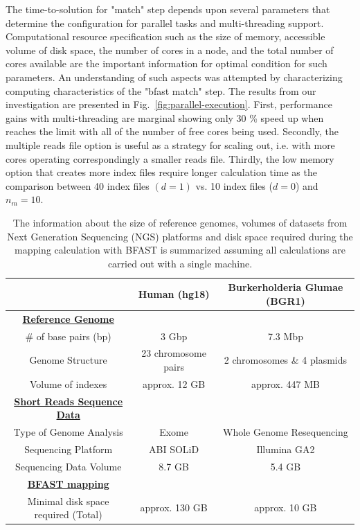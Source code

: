 \documentclass[12pt]{article}
\begin{document}
The time-to-solution for "match" step depends upon several parameters that determine the configuration for parallel tasks and multi-threading support.  Computational resource specification such as the size of memory, accessible volume of disk space, the number of cores in a node, and the total number of cores available are the important information for optimal condition for such parameters.  An understanding of such aspects was attempted by characterizing computing characteristics of the "bfast match" step.  The results from our investigation are presented  in Fig.~\ref{fig:parallel-execution}. First, performance gains with multi-threading are marginal showing only 30 \% speed up when reaches the limit with all of the number of free cores being used.  
Secondly, the multiple reads file option is useful as a strategy for scaling out, i.e. with more cores operating correspondingly a smaller reads file.  Thirdly, the low memory option that creates more index files require longer calculation time as the comparison between 40 index files $(d = 1)$ vs. 10 index files ($ d = 0 $) and $n_m = 10$.   





\begin{table}
\begin{tabular}{|ccc|} 
  \hline 
   & Human (hg18) & Burkerholderia Glumae (BGR1)  \\ \hline
 \underline{\textbf{Reference Genome}}   \\
    \# of base pairs (bp) &  3 Gbp & 7.3 Mbp \\
   Genome Structure &   23 chromosome pairs  & 2 chromosomes \& 4 plasmids  \\  
    Volume of indexes  & approx. 12 GB  & approx. 447 MB  \\
    \underline{ \textbf{Short Reads Sequence Data}}   \\
  Type of Genome Analysis &  Exome  & Whole Genome Resequencing \\
  Sequencing Platform & ABI SOLiD  &  Illumina GA2 \\
  Sequencing Data Volume  & 8.7 GB & 5.4 GB \\
  \underline{ \textbf{BFAST mapping} }  \\
  Minimal disk space required (Total) &  approx. 130 GB   &    approx. 10 GB   \\

\hline
\end{tabular} \caption{The information about the size of reference genomes, volumes of datasets from Next Generation Sequencing (NGS) platforms and disk space required during the mapping calculation with BFAST is summarized assuming all calculations are carried out with a single machine.}
 \label{table:two-genomes} 
\end{table}
\end{document}
